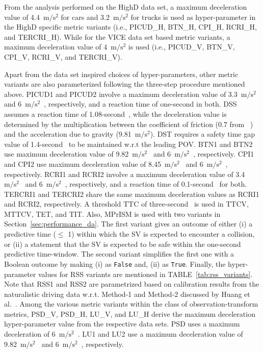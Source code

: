 \documentclass[journal]{IEEEtran}
\begin{document}
From the analysis performed on the HighD data set, a maximum deceleration value of 4.4~$\mathrm{m/s^2}$ for cars and 3.2~$\mathrm{m/s^2}$ for trucks is used as hyper-parameter in the HighD specific metric variants (i.e., PICUD\_H, BTN\_H, CPI\_H, RCRI\_H, and TERCRI\_H). While for the VICE data set based metric variants, a maximum deceleration value of 4~$\mathrm{m/s^2}$ is used (i.e., PICUD\_V, BTN\_V, CPI\_V, RCRI\_V, and TERCRI\_V).

Apart from the data set inspired choices of hyper-parameters, other metric variants are also parameterized following the three-step procedure mentioned above. PICUD1 and PICUD2 involve a maximum deceleration value of 3.3~$\mathrm{m/s^2}$~\cite{uno2002microscopic} and 6~$\mathrm{m/s^2}$~\cite{seiniger2015methodology}, respectively, and a reaction time of one-second in both. DSS assumes a reaction time of 1.08-second~\cite{okamura2011impact}, while the deceleration value is determined by the multiplication between the coefficient of friction (0.7 from ~\cite{navin1996vehicle}) and the acceleration due to gravity (9.81~$\mathrm{m/s^2}$). DST requires a safety time gap value of 1.4-second~\cite{okamura2011impact} to be maintained w.r.t the leading POV. BTN1 and BTN2 use maximum deceleration value of 9.82~$\mathrm{m/s^2}$~\cite{Jansson2005CollisionAT} and 6~$\mathrm{m/s^2}$~\cite{seiniger2015methodology}, respectively. CPI1 and CPI2 use maximum deceleration value of 8.45~$\mathrm{m/s^2}$~\cite{cunto2008assessing} and 6~$\mathrm{m/s^2}$~\cite{seiniger2015methodology}, respectively. RCRI1 and RCRI2 involve a maximum deceleration value of 3.4~$\mathrm{m/s^2}$~\cite{oh2006method} and 6~$\mathrm{m/s^2}$~\cite{seiniger2015methodology}, respectively, and a reaction time of 0.1-second~\cite{oh2006method} for both. TERCRI1 and TERCRI2 share the same maximum deceleration values as RCRI1 and RCRI2, respectively. A threshold TTC of three-second~\cite{hirst1997format} is used in TTCV, MTTCV, TET, and TIT. Also, MPrISM is used with two variants in Section~\ref{sec:performance_da}. The first variant gives an outcome of either (i) a predictive time ($\leq$ 1) within which the SV is expected to encounter a collision, or (ii) a statement that the SV is expected to be safe within the one-second predictive time-window. The second variant simplifies the first one with a Boolean outcome by making (i) as \texttt{False} and, (ii) as \texttt{True}. Finally, the hyper-parameter values for RSS variants are mentioned in TABLE~\ref{tab:rss_variants}. Note that RSS1 and RSS2 are parametrized based on calibration results from the naturalistic driving data w.r.t. Method-1 and Method-2 discussed by Huang et al.~\cite{huang2021rss}. Among the various metric variants within the class of observation-transform metrics, PSD\_V, PSD\_H, LU\_V, and LU\_H derive the maximum deceleration hyper-parameter value from the respective data sets. PSD uses a maximum deceleration of 6~$\mathrm{m/s^2}$~\cite{seiniger2015methodology}. LU1 and LU2 use a maximum deceleration value of 9.82~$\mathrm{m/s^2}$~\cite{Jansson2005CollisionAT} and 6~$\mathrm{m/s^2}$~\cite{seiniger2015methodology}, respectively.
\end{document}
